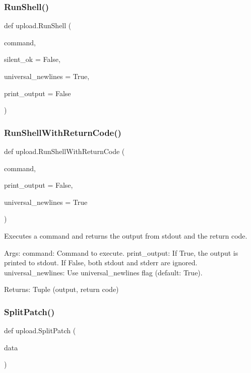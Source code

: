 \subsubsection{\texorpdfstring{RunShell()}{RunShell()}}
{\footnotesize\ttfamily def upload.\+Run\+Shell (\begin{DoxyParamCaption}\item[{}]{command,  }\item[{}]{silent\+\_\+ok = {\ttfamily False},  }\item[{}]{universal\+\_\+newlines = {\ttfamily True},  }\item[{}]{print\+\_\+output = {\ttfamily False} }\end{DoxyParamCaption})}

\mbox{\label{namespaceupload_afa542d3a5a4f4fce174a1c23644a9204}} 
\subsubsection{\texorpdfstring{RunShellWithReturnCode()}{RunShellWithReturnCode()}}
{\footnotesize\ttfamily def upload.\+Run\+Shell\+With\+Return\+Code (\begin{DoxyParamCaption}\item[{}]{command,  }\item[{}]{print\+\_\+output = {\ttfamily False},  }\item[{}]{universal\+\_\+newlines = {\ttfamily True} }\end{DoxyParamCaption})}

\begin{DoxyVerb}Executes a command and returns the output from stdout and the return code.

Args:
  command: Command to execute.
  print_output: If True, the output is printed to stdout.
                If False, both stdout and stderr are ignored.
  universal_newlines: Use universal_newlines flag (default: True).

Returns:
  Tuple (output, return code)
\end{DoxyVerb}
 \mbox{\label{namespaceupload_a9dd260785ca4cc97e245234811ef1949}} 
\subsubsection{\texorpdfstring{SplitPatch()}{SplitPatch()}}
{\footnotesize\ttfamily def upload.\+Split\+Patch (\begin{DoxyParamCaption}\item[{}]{data }\end{DoxyParamCaption})}

